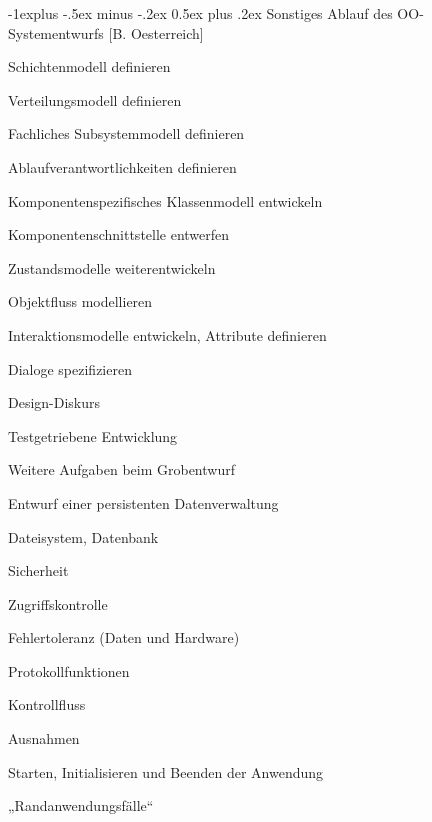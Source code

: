 \documentclass[a4paper]{article}
\makeatletter
\renewcommand{\subsection}{\@startsection{subsection}{2}{0mm}%
                                {-1explus -.5ex minus -.2ex}%
                                {0.5ex plus .2ex}%
                                {\normalfont\normalsize\bfseries}}
\makeatother
\begin{document}
\begin{multicols}{3}
  \subsection{Sonstiges}
  Ablauf des OO-Systementwurfs [B. Oesterreich]
  \begin{itemize*}
    \item Schichtenmodell definieren
    \item Verteilungsmodell definieren
    \item Fachliches Subsystemmodell definieren
    \item Ablaufverantwortlichkeiten definieren
    \item Komponentenspezifisches Klassenmodell entwickeln
    \item Komponentenschnittstelle entwerfen
    \item Zustandsmodelle weiterentwickeln
    \item Objektfluss modellieren
    \item Interaktionsmodelle entwickeln, Attribute definieren
    \item Dialoge spezifizieren
    \item Design-Diskurs
    \item Testgetriebene Entwicklung
  \end{itemize*}

  Weitere Aufgaben beim Grobentwurf
  \begin{itemize*}
    \item Entwurf einer persistenten Datenverwaltung
    \begin{itemize*}
      \item Dateisystem, Datenbank
    \end{itemize*}
    \item Sicherheit
    \begin{itemize*}
      \item Zugriffskontrolle
      \item Fehlertoleranz (Daten und Hardware)
      \item Protokollfunktionen
    \end{itemize*}
    \item Kontrollfluss
    \begin{itemize*}
      \item Ausnahmen
      \item Starten, Initialisieren und Beenden der Anwendung
      \item „Randanwendungsfälle“
    \end{itemize*}
  \end{itemize*}


\end{multicols}
\end{document}

